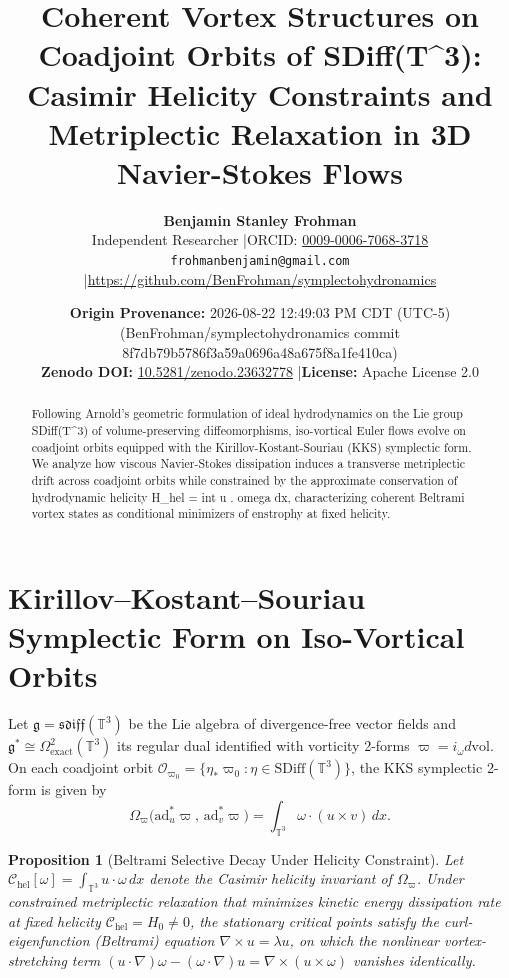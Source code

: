 \documentclass[11pt,letterpaper]{article}
\title{\textbf{Coherent Vortex Structures on Coadjoint Orbits of SDiff(T\textasciicircum{}3): Casimir Helicity Constraints and Metriplectic Relaxation in 3D Navier-Stokes Flows}}
\author{\textbf{Benjamin Stanley Frohman}\\
Independent Researcher \quad|\quad ORCID: \href{https://orcid.org/0009-0006-7068-3718}{0009-0006-7068-3718}\\
\texttt{frohmanbenjamin@gmail.com} \quad|\quad \url{https://github.com/BenFrohman/symplectohydronamics}}
\date{\textbf{Origin Provenance:} 2026-08-22 12:49:03 PM CDT (UTC-5) (BenFrohman/symplectohydronamics commit 8f7db79b5786f3a59a0696a48a675f8a1fe410ca)\\
\textbf{Zenodo DOI:} \href{https://doi.org/10.5281/zenodo.23632778}{10.5281/zenodo.23632778} \quad|\quad \textbf{License:} Apache License 2.0}
\newtheorem{proposition}[theorem]{Proposition}
\begin{document}
\maketitle

\begin{center}
\end{center}

\begin{abstract}
\noindent Following Arnold's geometric formulation of ideal hydrodynamics on the Lie group SDiff(T\textasciicircum{}3) of volume-preserving diffeomorphisms, iso-vortical Euler flows evolve on coadjoint orbits equipped with the Kirillov-Kostant-Souriau (KKS) symplectic form. We analyze how viscous Navier-Stokes dissipation induces a transverse metriplectic drift across coadjoint orbits while constrained by the approximate conservation of hydrodynamic helicity H\_hel = int u . omega dx, characterizing coherent Beltrami vortex states as conditional minimizers of enstrophy at fixed helicity.
\end{abstract}


\section{Kirillov--Kostant--Souriau Symplectic Form on Iso-Vortical Orbits}
Let $\mathfrak{g} = \mathfrak{sdiff}(\mathbb{T}^3)$ be the Lie algebra of divergence-free vector fields and $\mathfrak{g}^* \cong \Omega^2_{\mathrm{exact}}(\mathbb{T}^3)$ its regular dual identified with vorticity 2-forms $\varpi = i_\omega d\mathrm{vol}$. On each coadjoint orbit $\mathcal{O}_{\varpi_0} = \{\eta_* \varpi_0 : \eta \in \mathrm{SDiff}(\mathbb{T}^3)\}$, the KKS symplectic 2-form is given by
\begin{equation}
\Omega_\varpi\bigl(\mathrm{ad}^*_u \varpi,\, \mathrm{ad}^*_v \varpi\bigr) = \int_{\mathbb{T}^3} \omega \cdot (u \times v)\,dx.
\end{equation}

\begin{proposition}[Beltrami Selective Decay Under Helicity Constraint]
Let $\mathcal{C}_{\mathrm{hel}}[\omega] = \int_{\mathbb{T}^3} u \cdot \omega\,dx$ denote the Casimir helicity invariant of $\Omega_\varpi$. Under constrained metriplectic relaxation that minimizes kinetic energy dissipation rate at fixed helicity $\mathcal{C}_{\mathrm{hel}} = H_0 \ne 0$, the stationary critical points satisfy the curl-eigenfunction (Beltrami) equation $\nabla \times u = \lambda u$, on which the nonlinear vortex-stretching term $(u \cdot \nabla)\omega - (\omega \cdot \nabla)u = \nabla \times (u \times \omega)$ vanishes identically.
\end{proposition}
\end{document}

